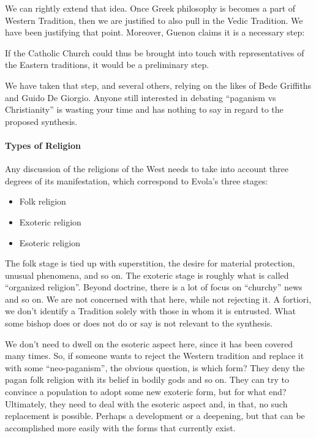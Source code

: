 We can rightly extend that idea. Once Greek philosophy is becomes a part of Western Tradition, then we are justified to also pull in the Vedic Tradition. We have been justifying that point. Moreover, Guenon claims it is a necessary step:

\begin{quotex}
If the Catholic Church could thus be brought into touch with representatives of the Eastern traditions, it would be a preliminary step.
\end{quotex}


We have taken that step, and several others, relying on the likes of Bede Griffiths and Guido De Giorgio. Anyone still interested in debating ``paganism vs Christianity'' is wasting your time and has nothing to say in regard to the proposed synthesis.

\paragraph{Types of Religion}


Any discussion of the religions of the West needs to take into account three degrees of its manifestation, which correspond to Evola's three stages:

\begin{itemize}


\item Folk religion

\item Exoteric religion

\item Esoteric religion
\end{itemize}


The folk stage is tied up with superstition, the desire for material protection, unusual phenomena, and so on. The exoteric stage is roughly what is called ``organized religion''. Beyond doctrine, there is a lot of focus on ``churchy'' news and so on. We are not concerned with that here, while not rejecting it. A fortiori, we don't identify a Tradition solely with those in whom it is entrusted. What some bishop does or does not do or say is not relevant to the synthesis.

We don't need to dwell on the esoteric aspect here, since it has been covered many times. So, if someone wants to reject the Western tradition and replace it with some ``neo-paganism'', the obvious question, is which form? They deny the pagan folk religion with its belief in bodily gods and so on. They can try to convince a population to adopt some new exoteric form, but for what end? Ultimately, they need to deal with the esoteric aspect and, in that, no such replacement is possible. Perhaps a development or a deepening, but that can be accomplished more easily with the forms that currently exist.

